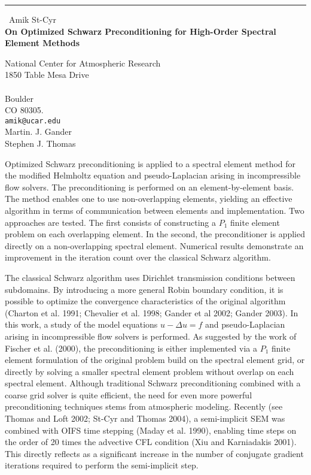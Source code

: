 \documentclass{report}
\begin{document}
\begin{center}
\rule{6in}{1pt} \
{\large Amik St-Cyr \\
{\bf On Optimized Schwarz Preconditioning for High-Order Spectral Element Methods}}

National Center for Atmospheric Research \\ 1850 Table Mesa Drive \\ \\ Boulder \\ CO 80305.
\\
{\tt amik@ucar.edu}\\
Martin. J. Gander\\
Stephen J. Thomas\end{center}

Optimized Schwarz preconditioning is applied to a spectral element method
for the modified Helmholtz equation and pseudo-Laplacian arising in
incompressible flow solvers. The preconditioning is performed on an
element-by-element basis. The method enables one to use non-overlapping
elements, yielding an effective algorithm in terms of communication
between elements and implementation. Two approaches are tested. The first
consists of constructing a $P_1$ finite element problem on each
overlapping element. In the second, the preconditioner is applied
directly on a non-overlapping spectral element. Numerical results demonstrate
an improvement in the iteration count over the classical Schwarz algorithm.


\noindent The classical Schwarz algorithm uses Dirichlet transmission conditions
between subdomains. By introducing a more general Robin boundary
condition, it is possible to optimize the convergence characteristics
of the original algorithm (Charton et al. 1991; Chevalier et al. 1998;
Gander et al 2002; Gander 2003). In this work, a study of
the model equations $u - \Delta u = f$ and pseudo-Laplacian arising
in incompressible flow solvers is performed. As suggested by the work
of Fischer et al. (2000), the preconditioning is either implemented via a $P_1$
finite element formulation of the original problem build on the spectral
element grid, or directly by solving a smaller spectral element problem
without overlap on each spectral element.
Although traditional Schwarz preconditioning combined with a coarse
grid solver is quite efficient, the need for even more powerful
preconditioning techniques stems from atmospheric modeling. Recently
(see Thomas and Loft 2002; St-Cyr and Thomas 2004), a semi-implicit SEM was combined with
OIFS time stepping (Maday et al. 1990), enabling time steps on the order of
20 times the advective CFL condition (Xiu and Karniadakis 2001). This directly reflects
as a significant increase in the number of conjugate gradient iterations
required to perform the semi-implicit step.
\end{document}
